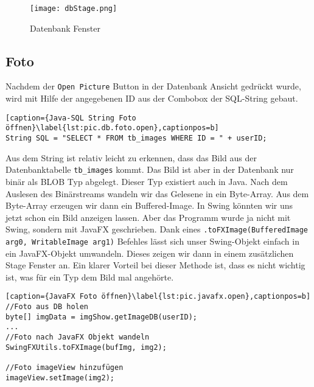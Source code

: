 \begin{figure}[h]
  \begin{center}
    \texttt{[image: dbStage.png]}
  		  \caption{Datenbank Fenster}
     \label{fig.DatenbankFenster}
  \end{center}
\end{figure}

\subsection{Foto}
\label{subsec.foto}
Nachdem der \texttt{Open Picture} Button in der Datenbank Ansicht gedrückt wurde, wird mit Hilfe der angegebenen ID aus der Combobox der SQL-String gebaut.

\begin{lstlisting}[caption={Java-SQL String Foto öffnen}\label{lst:pic.db.foto.open},captionpos=b]
String SQL = "SELECT * FROM tb_images WHERE ID = " + userID;
\end{lstlisting}

Aus dem String ist relativ leicht zu erkennen, dass das Bild aus der Datenbanktabelle \texttt{tb\_images} kommt. Das Bild ist aber in der Datenbank nur binär als BLOB Typ abgelegt. Dieser Typ existiert auch in Java. Nach dem Auslesen des Binärstreams wandeln wir das Gelesene in ein Byte-Array. Aus dem Byte-Array erzeugen wir dann ein Buffered-Image. In Swing könnten wir uns jetzt schon ein Bild anzeigen lassen. Aber das Programm wurde ja nicht mit Swing, sondern mit JavaFX geschrieben. Dank eines \texttt{.toFXImage(BufferedImage arg0, WritableImage arg1)} Befehles lässt sich unser Swing-Objekt einfach in ein JavaFX-Objekt umwandeln. Dieses zeigen wir dann in einem zusätzlichen Stage Fenster an. Ein klarer Vorteil bei dieser Methode ist, dass es nicht wichtig ist, was für ein Typ dem Bild mal angehörte.\newpage
\begin{lstlisting}[caption={JavaFX Foto öffnen}\label{lst:pic.javafx.open},captionpos=b]
//Foto aus DB holen
byte[] imgData = imgShow.getImageDB(userID);
...
//Foto nach JavaFX Objekt wandeln
SwingFXUtils.toFXImage(bufImg, img2);

//Foto imageView hinzufügen
imageView.setImage(img2);
\end{lstlisting}

